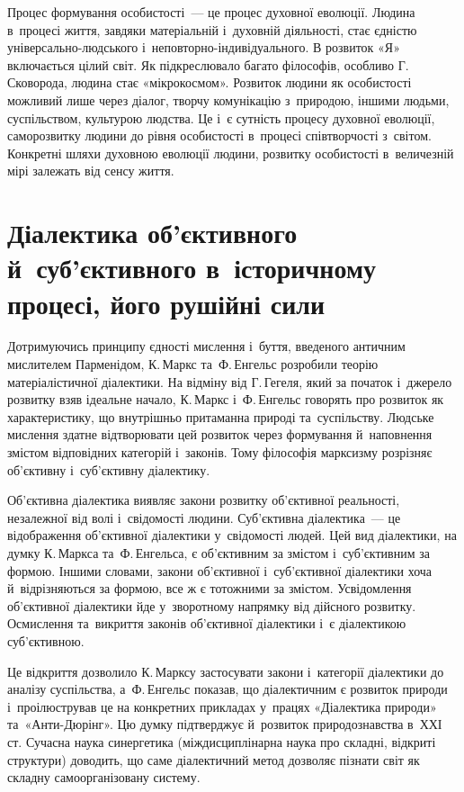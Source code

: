 \documentclass[a5paper,oneside,DIV=12,12pt,headings=small]{scrartcl}
\begin{document}
		Процес формування особистості~— це процес духовної еволюції. Людина в~процесі життя, завдяки матеріальній і~духовній діяльності, стає єдністю універсально-людського і~неповторно-індивідуального. В розвиток «Я» включається цілий світ. Як підкреслювало багато філософів, особливо Г.\,Сковорода, людина стає «мікрокосмом». Розвиток людини як особистості можливий лише через діалог, творчу комунікацію з~природою, іншими людьми, суспільством, культурою людства. Це і~є сутність процесу духовної еволюції, саморозвитку людини до рівня особистості в~процесі співтворчості з~світом. Конкретні шляхи духовною еволюції людини, розвитку особистості в~величезній мірі залежать від сенсу життя.

	\section{Діалектика об'\-єктивного й~суб'\-єктивного в~історичному процесі, його рушійні сили}
		Дотримуючись принципу єдності мислення і~буття, введеного античним мислителем Парменідом, К.\,Маркс та~Ф.\,Енгельс розробили теорію матеріалістичної діалектики. На відміну від Г.\,Гегеля, який за початок і~джерело розвитку взяв ідеальне начало, К.\,Маркс і~Ф.\,Енгельс говорять про розвиток як характеристику, що внутрішньо притаманна природі та~суспільству. Людське мислення здатне відтворювати цей розвиток через формування й~наповнення змістом відповідних категорій і~законів. Тому філософія марксизму розрізняє об'\-єктивну і~суб'\-єктивну діалектику.
		
		Об'єктивна діалектика виявляє закони розвитку об'\-єктивної реальності, незалежної від волі і~свідомості людини. Суб'єктивна діалектика~— це відображення об'\-єктивної діалектики у~свідомості людей. Цей вид діалектики, на думку К.\,Маркса та~Ф.\,Енгельса, є об'\-єктивним за змістом і~суб'\-єктивним за формою. Іншими словами, закони об'\-єктивної і~суб'\-єктивної діалектики хоча й~відрізняються за формою, все ж є тотожними за змістом. Усвідомлення об'\-єктивної діалектики йде у~зворотному напрямку від дійсного розвитку. Осмислення та~викриття законів об'\-єктивної діалектики і~є діалектикою суб'\-єктивною.
		
		Це відкриття дозволило К.\,Марксу застосувати закони і~категорії діалектики до аналізу суспільства, а~Ф.\,Енгельс показав, що діалектичним є розвиток природи і~проілюстрував це на конкретних прикладах у~працях «Діалектика природи» та~«Анти-Дюрінг». Цю думку підтверджує й~розвиток природознавства в~ХХІ ст. Сучасна наука синергетика (міждисциплінарна наука про складні, відкриті структури) доводить, що саме діалектичний метод дозволяє пізнати світ як складну самоорганізовану систему.
		
\end{document}

